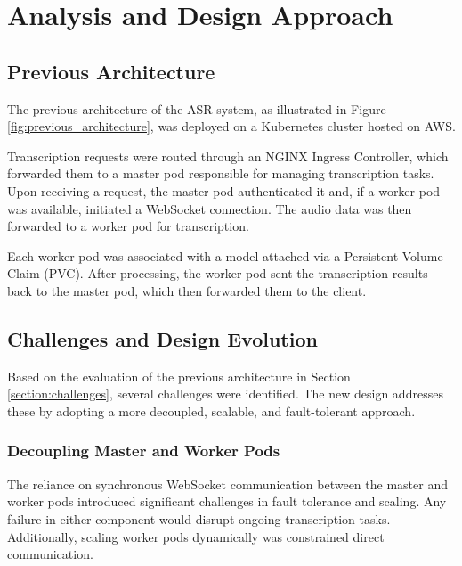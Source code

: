\chapter{Analysis and Design Approach} \label{chapter:analysis_and_design}
\section{Previous Architecture}
The previous architecture of the ASR system, as illustrated in Figure \ref{fig:previous_architecture}, was deployed on a Kubernetes cluster hosted on AWS.

Transcription requests were routed through an NGINX Ingress Controller, which forwarded them to a master pod responsible for managing transcription tasks. Upon receiving a request, the master pod authenticated it and, if a worker pod was available, initiated a WebSocket connection. The audio data was then forwarded to a worker pod for transcription.

Each worker pod was associated with a model attached via a Persistent Volume Claim (PVC). After processing, the worker pod sent the transcription results back to the master pod, which then forwarded them to the client.

\section{Challenges and Design Evolution}
Based on the evaluation of the previous architecture in Section \ref{section:challenges}, several challenges were identified. The new design addresses these by adopting a more decoupled, scalable, and fault-tolerant approach.

\subsection{Decoupling Master and Worker Pods}
The reliance on synchronous WebSocket communication between the master and worker pods introduced significant challenges in fault tolerance and scaling. Any failure in either component would disrupt ongoing transcription tasks. Additionally, scaling worker pods dynamically was constrained direct communication.

